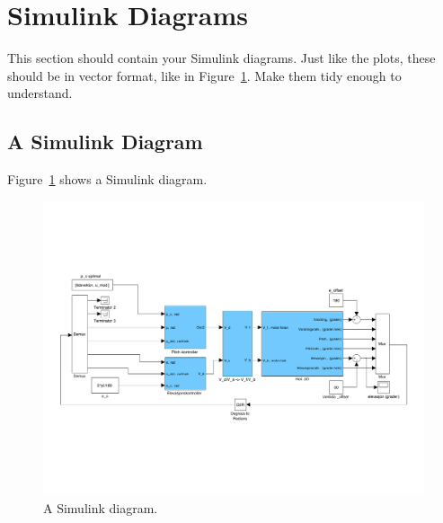 \section{Simulink Diagrams}\label{sec:simulink}
This section should contain your Simulink diagrams. Just like the plots, these should be in vector format, like in Figure~\ref{fig:simulink}. Make them tidy enough to understand.

\subsection{A Simulink Diagram}
Figure~\ref{fig:simulink} shows a Simulink diagram.
\begin{figure}[htb]
	\centering
		\includegraphics[width = \textwidth]{figures/simulink.pdf}
	\caption{A Simulink diagram.}
	\label{fig:simulink}
\end{figure}